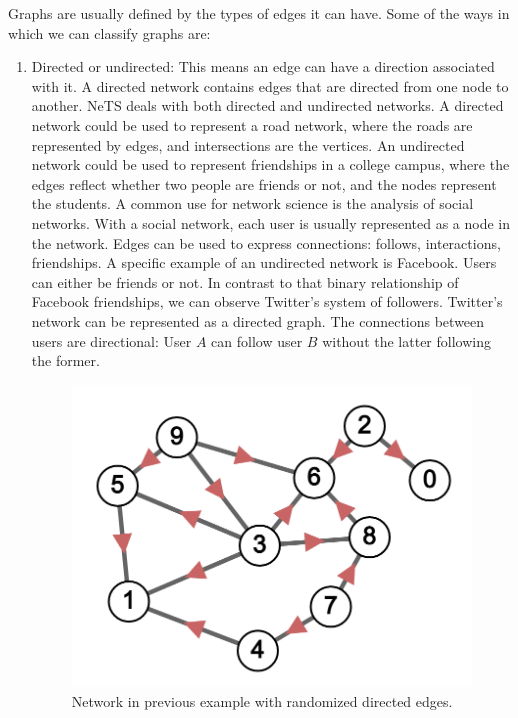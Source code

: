 Graphs are usually defined by the types of edges it can have.
Some of the ways in which we can classify graphs are:
\begin{enumerate}
  \item Directed or undirected: This means an edge can have a direction associated with it.
  A directed network contains edges that are directed from one node to another.
  NeTS deals with both directed and undirected networks.
  A directed network could be used to represent a road network,
  where the roads are represented by edges, and intersections are the vertices.
  An undirected network could be used to represent friendships in a college campus,
  where the edges reflect whether two people are friends or not,
  and the nodes represent the students.
  A common use for network science is the analysis of social networks.
  With a social network, each user is usually represented as a node in the network.
  Edges can be used to express connections: follows, interactions, friendships.
  A specific example of an undirected network is Facebook.
  Users can either be friends or not.
  In contrast to that binary relationship of Facebook friendships,
  we can observe Twitter's system of followers.
  Twitter's network can be represented as a directed graph.
  The connections between users are directional:
  User $A$ can follow user $B$ without the latter following the former.

  \begin{figure}[H]
    \centering
    \includegraphics[scale=.25]{img/directed_sample.png}
    \caption{Network in previous example with randomized directed edges.}
    \label{fig:net_di}
  \end{figure}


\end{enumerate}
